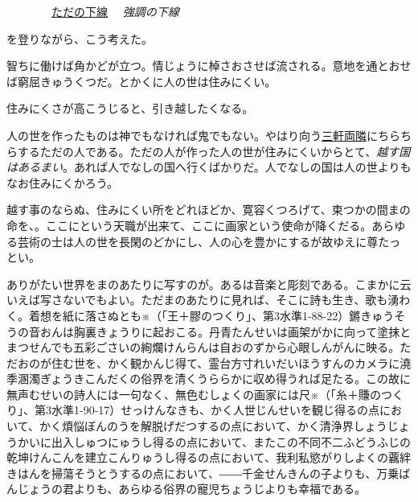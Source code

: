 \documentclass[book, twoside, paper=b5j, fleqn, jafontsize=9pt, jafontscale=0.91, head_space=22mm, foot_space=9mm, fore-edge=16mm, gutter=25mm, hanging_punctuation]{jlreq}
\begin{document}
\pagestyle{empty}

\pagestyle{normal}




\uline{ただの下線}　
\emph{強調の下線}　

を登りながら、こう考えた。

智ちに働けば角かどが立つ。情じょうに棹さおさせば流される。意地を通とおせば窮屈きゅうくつだ。とかくに人の世は住みにくい。

住みにくさが高こうじると、引き越したくなる。

人の世を作ったものは神でもなければ鬼でもない。やはり向う\uline{三軒両隣}にちらちらするただの人である。ただの人が作った人の世が住みにくいからとて、\emph{越す国はあるまい}。あれば人でなしの国へ行くばかりだ。人でなしの国は人の世よりもなお住みにくかろう。

越す事のならぬ、住みにくい所をどれほどか、寛容くつろげて、束つかの間まの命を、。ここにという天職が出来て、ここに画家という使命が降くだる。あらゆる芸術の士は人の世を長閑のどかにし、人の心を豊かにするが故ゆえに尊たっとい。

ありがたい世界をまのあたりに写すのが。あるは音楽と彫刻である。こまかに云いえば写さないでもよい。ただまのあたりに見れば、そこに詩も生き、歌も湧わく。着想を紙に落さぬとも※（「王＋膠のつくり」、第3水準1-88-22）鏘きゅうそうの音おんは胸裏きょうりに起おこる。丹青たんせいは画架がかに向って塗抹とまつせんでも五彩ごさいの絢爛けんらんは自おのずから心眼しんがんに映る。ただおのが住む世を、かく観かんじ得て、霊台方寸れいだいほうすんのカメラに澆季溷濁ぎょうきこんだくの俗界を清くうららかに収め得うれば足たる。この故に無声むせいの詩人には一句なく、無色むしょくの画家には尺※（「糸＋賺のつくり」、第3水準1-90-17）せっけんなきも、かく人世じんせいを観じ得るの点において、かく煩悩ぼんのうを解脱げだつするの点において、かく清浄界しょうじょうかいに出入しゅつにゅうし得るの点において、またこの不同不二ふどうふじの乾坤けんこんを建立こんりゅうし得るの点において、我利私慾がりしよくの覊絆きはんを掃蕩そうとうするの点において、――千金せんきんの子よりも、万乗ばんじょうの君よりも、あらゆる俗界の寵児ちょうじよりも幸福である。
\end{document}
